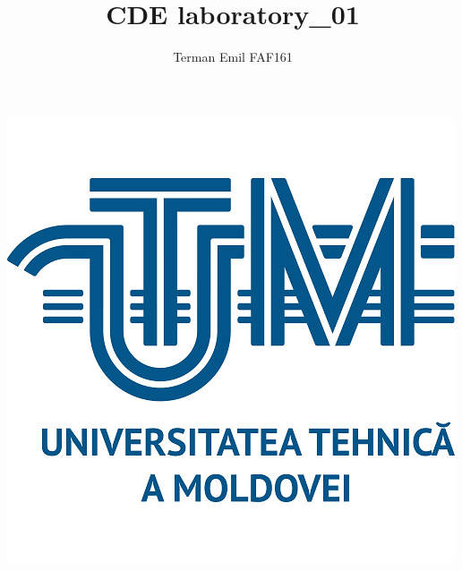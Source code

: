 \documentclass{article}
\begin{document}
	\newcommand{\ROne}{99.8}
	\newcommand{\RTwo}{198}
	\newcommand{\RThree}{53.7}
	\newcommand{\RMax}{473}
	
	\newcommand{\IPosOne}{42.1}
	\newcommand{\IPosTwo}{96.0}

	\newcommand{\UExOneOne}{4.24}
	\newcommand{\UExOneTwo}{8.43}
	\newcommand{\UExOneThree}{2.26}

	\newcommand{\IExTwoOne}{61.7}
	\newcommand{\IExTwoTwo}{43.2}
	\newcommand{\IExTwoThree}{18.6}

	\newcommand{\UExTwoOne}{6.66}
	\newcommand{\UExTwoTwo}{8.69}
	\newcommand{\UExTwoThree}{8.69}

	\makeatletter
	\newenvironment{sqcases} {
		\matrix@check\sqcases\env@sqcases
	}{
		\endarray \right.
	}
	\def\env@sqcases {
		\let \@ifnextchar \new@ifnextchar
		\left \lbrack
		\def \arraystretch{1.2}
		\array{@{}l@{\quad}l@{}}
	}
	\makeatother


	\title{CDE laboratory\_01}
	\author{Terman Emil FAF161}
	\maketitle

	\vspace*{\fill}
	
	\centering
	\includegraphics{imgs/UTM_logo.png}
\end{document}
